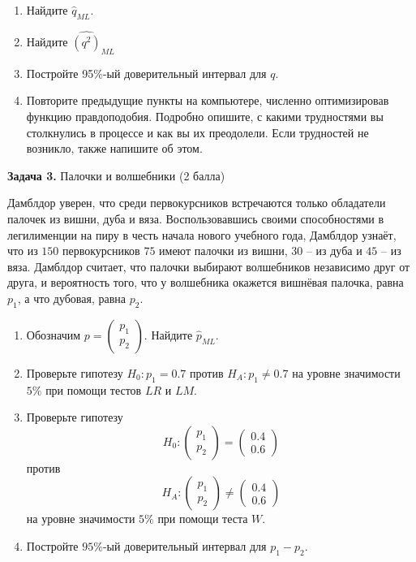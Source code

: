 \documentclass[10pt, a4paper]{extarticle}
\begin{document}
	\begin{enumerate}[label=\textbf{\alph*)}]
		\item Найдите $\hat{q}_{ML}$.
		\item Найдите $\widehat{(q^2)}_{ML}$
		\item Постройте 95\%-ый доверительный интервал для $q$.
		\item Повторите предыдущие пункты на компьютере, численно оптимизировав функцию правдоподобия.
		Подробно опишите, с какими трудностями вы столкнулись в процессе и как вы их преодолели.
		Если трудностей не возникло, также напишите об этом. 
	\end{enumerate}

	{\Large \textbf{Задача 3.} Палочки и волшебники (2 балла)}
	
	Дамблдор уверен, что среди первокурсников встречаются только обладатели палочек из вишни, дуба и вяза.
	Воспользовавшись своими способностями в легилименции на пиру в честь начала нового учебного года, Дамблдор узнаёт, что из $150$ первокурсников $75$ имеют палочки из вишни, $30$ -- из дуба и $45$ -- из вяза.
	Дамблдор считает, что палочки выбирают волшебников независимо друг от друга, и вероятность того, что у волшебника окажется вишнёвая палочка, равна $p_1$, а что дубовая, равна $p_2$.
	
	\begin{enumerate}[label=\textbf{\alph*)}]
		\item Обозначим $p = \begin{pmatrix}
			p_1 \\
			p_2
		\end{pmatrix}$. Найдите $\hat{p}_{ML}$.
		
		\item Проверьте гипотезу $H_0: p_1 = 0.7$ против $H_A: p_1 \ne 0.7$ на уровне значимости $5\%$ при помощи тестов $LR$ и $LM$.
		
		\item Проверьте гипотезу
		\[
		H_0: \begin{pmatrix}
			p_1 \\
			p_2
		\end{pmatrix} = \begin{pmatrix}
		0.4 \\
		0.6
	\end{pmatrix}
	\]
 	против 
 	\[
 	H_A: \begin{pmatrix}
 		p_1 \\
 		p_2
 	\end{pmatrix} \ne \begin{pmatrix}
 		0.4 \\
 		0.6
 	\end{pmatrix}
 	\]
 	на уровне значимости $5\%$ при помощи теста $W$.
 	\item Постройте $95\%$-ый доверительный интервал для $p_1 - p_2$.
	\end{enumerate}
\end{document}
